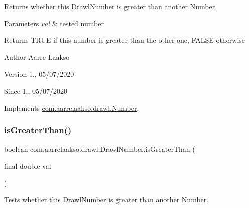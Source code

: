 Returns whether this \hyperlink{classcom_1_1aarrelaakso_1_1drawl_1_1_drawl_number}{Drawl\+Number} is greater than another \hyperlink{interfacecom_1_1aarrelaakso_1_1drawl_1_1_number}{Number}. 


\begin{DoxyParams}{Parameters}
{\em val} & tested number \\
\hline
\end{DoxyParams}
\begin{DoxyReturn}{Returns}
{\ttfamily T\+R\+UE} if this number is greater than the other one, {\ttfamily F\+A\+L\+SE} otherwise 
\end{DoxyReturn}
\begin{DoxyAuthor}{Author}
Aarre Laakso 
\end{DoxyAuthor}
\begin{DoxyVersion}{Version}
1., 05/07/2020 
\end{DoxyVersion}
\begin{DoxySince}{Since}
1., 05/07/2020 
\end{DoxySince}


Implements \hyperlink{interfacecom_1_1aarrelaakso_1_1drawl_1_1_number_a487be710eb911b7f3395014ee8cd4155}{com.\+aarrelaakso.\+drawl.\+Number}.

\mbox{\label{classcom_1_1aarrelaakso_1_1drawl_1_1_drawl_number_ae60f5bdfeec3c50dec35e5310f163fa4}} 
\subsubsection{\texorpdfstring{is\+Greater\+Than()}{isGreaterThan()}\hspace{0.1cm}{\footnotesize\ttfamily [2/2]}}
{\footnotesize\ttfamily boolean com.\+aarrelaakso.\+drawl.\+Drawl\+Number.\+is\+Greater\+Than (\begin{DoxyParamCaption}\item[{final double}]{val }\end{DoxyParamCaption})}



Tests whether this \hyperlink{classcom_1_1aarrelaakso_1_1drawl_1_1_drawl_number}{Drawl\+Number} is greater than another \hyperlink{interfacecom_1_1aarrelaakso_1_1drawl_1_1_number}{Number}. 


